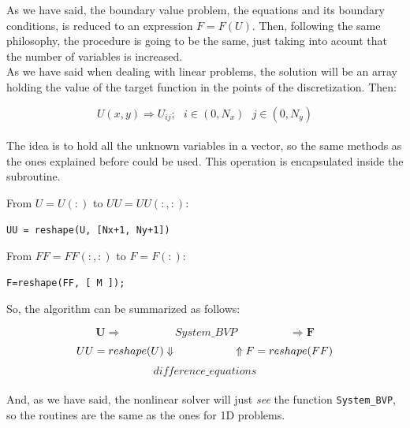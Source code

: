 As we have said, the boundary value problem, the equations and its boundary
conditions, is reduced to an expression $F=F(U)$. Then, following the same
philosophy, the procedure is going to be the same, just taking into acount that
the number of variables is increased. \\

As we have said when dealing with linear problems, the solution will be an array
holding the value of the target function in the points of the discretization.
Then: 

$$
U(x,y) \Longrightarrow U_{ij}; \:\:\: i \in (0,N_x) \:\:\: j \in (0,N_y)
$$\\

The idea is to hold all the unknown variables in a vector, so the same methods
as the ones explained before could be used. This operation is encapsulated
inside the subroutine. \\

\begin{multicols}{2}


From $U=U(:)$ to $UU=UU(:,:)$:\\

\begin{blueframed}
\begin{lstlisting}
UU = reshape(U, [Nx+1, Ny+1])
\end{lstlisting}
\end{blueframed}

\columnbreak

From $FF=FF(:,:)$ to $F=F(:)$:

\begin{blueframed}
\begin{lstlisting}
F=reshape(FF, [ M ]);
\end{lstlisting}
\end{blueframed}

\end{multicols}

So, the algorithm can be summarized as follows: 


$$ \mathbf{U} \Longrightarrow \boxed{\hspace{2cm}System\_BVP\hspace{2cm}}
\Longrightarrow \mathbf{F}$$ 
$$ \hfill UU=reshape(U)\Downarrow  \hspace{2cm} \Uparrow F=reshape(FF) \hfill$$
$$ \boxed{difference\_equations}$$\\

And, as we have said, the nonlinear solver will just \textit{see} the function
\texttt{System\_BVP}, so the routines are the same as the ones for 1D problems.
\\


